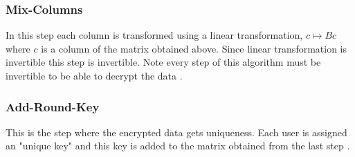 \documentclass[11pt]{amsart}
\theoremstyle{plain}
\theoremstyle{definition}
\numberwithin{equation}{section}
\begin{document}
\subsubsection{Mix-Columns}
In this step each column is transformed using a linear transformation, \(c \mapsto Bc\) where \(c\) is a column of the matrix obtained above. Since linear transformation is invertible this step is invertible. Note every step of this algorithm must be invertible to be able to decrypt the data \cite{aes}.

\subsubsection{Add-Round-Key}
This is the step where the encrypted data gets uniqueness. Each user is assigned an "unique key" and this key is added to the matrix obtained from the last step \cite{aes}.\\[7mm]
\end{document}

